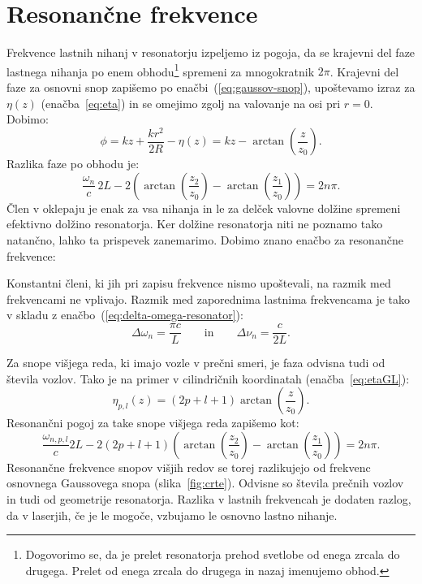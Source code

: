 \section{Resonančne frekvence}
Frekvence
lastnih nihanj v resonatorju izpeljemo iz pogoja, 
da se krajevni del faze lastnega nihanja po enem 
obhodu\footnote{Dogovorimo se, da je prelet resonatorja prehod svetlobe od enega zrcala
do drugega. Prelet od enega zrcala do drugega in nazaj imenujemo obhod.}
spremeni za mnogokratnik $2\pi$. Krajevni del faze za osnovni snop 
zapišemo po enačbi~(\ref{eq:gaussov-snop}), upoštevamo izraz za
$\eta(z)$ (enačba~\ref{eq:eta}) in se omejimo zgolj na valovanje na osi pri $r=0$.
Dobimo:
\begin{equation}
\phi = kz+\frac{kr^{2}}{2R} -\eta(z) = kz-\arctan \left(\frac{z}{z_{0}}\right)\!\!.
\label{eq:fazag}
\end{equation}
Razlika faze po obhodu je:
\begin{equation}
\frac{\omega_{n}}{c}\,2L-2\left(\arctan \left(\frac{z_{2}}{z_{0}}\right)-
\arctan\left(\frac{z_{1}}{z_{0}}\right)\right)=2n\pi.
\label{eq:fazan}
\end{equation}
Člen v oklepaju je enak za vsa nihanja in le za delček valovne dolžine 
spremeni efektivno dolžino resonatorja. Ker dolžine resonatorja niti ne poznamo
tako natančno, lahko ta prispevek zanemarimo. Dobimo znano enačbo za resonančne frekvence:

Konstantni členi, ki jih pri zapisu frekvence nismo upoštevali, na razmik med
frekvencami ne vplivajo. Razmik med zaporednima
lastnima frekvencama je tako v skladu z enačbo~(\ref{eq:delta-omega-resonator}):
\begin{equation}
\Delta\omega_n=\frac{\pi c}{L} \qquad \mathrm{in}\qquad \Delta \nu_n=\frac{c}{2L}.
\label{eq:deltaomega}
\end{equation}

Za snope višjega reda, ki imajo vozle v prečni smeri, je faza
odvisna tudi od števila vozlov. Tako je na primer v cilindričnih koordinatah
(enačba~\ref{eq:etaGL}):
\begin{equation}
\eta_{p,l}(z)=(2p+l+1)\arctan\left(\frac{z}{z_{0}}\right)\!\!.
\end{equation}
Resonančni pogoj za take snope višjega reda zapišemo kot:
\begin{equation}
\frac{\omega_{n,p,l}}{c}2L-2(2p+l+1)\left(\arctan\left(\frac{z_{2}}{z_{0}}\right)-
\arctan\left(\frac{z_{1}}{z_{0}}\right)\right)=2n\pi.
\end{equation}
Resonančne frekvence snopov višjih redov se torej razlikujejo od frekvenc
osnovnega Gaussovega snopa (slika~\ref{fig:crte}). Odvisne so števila prečnih vozlov
in tudi od geometrije resonatorja. 
Razlika v lastnih frekvencah je dodaten razlog, da v laserjih, če je le mogoče, 
vzbujamo le osnovno lastno nihanje.

